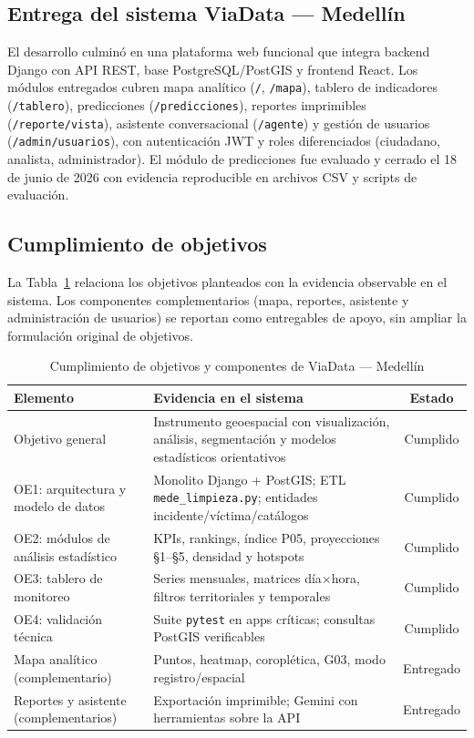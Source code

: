 \subsection{Entrega del sistema ViaData — Medellín}

El desarrollo culminó en una plataforma web funcional que integra backend Django con API REST, base PostgreSQL/PostGIS y frontend React. Los módulos entregados cubren mapa analítico (\texttt{/}, \texttt{/mapa}), tablero de indicadores (\texttt{/tablero}), predicciones (\texttt{/predicciones}), reportes imprimibles (\texttt{/reporte/vista}), asistente conversacional (\texttt{/agente}) y gestión de usuarios (\texttt{/admin/usuarios}), con autenticación JWT y roles diferenciados (ciudadano, analista, administrador). El módulo de predicciones fue evaluado y cerrado el 18 de junio de 2026 con evidencia reproducible en archivos CSV y scripts de evaluación.

\subsection{Cumplimiento de objetivos}

La Tabla~\ref{tab:cumplimiento-objetivos} relaciona los objetivos planteados con la evidencia observable en el sistema. Los componentes complementarios (mapa, reportes, asistente y administración de usuarios) se reportan como entregables de apoyo, sin ampliar la formulación original de objetivos.

\begin{table}[H]
	\centering
	\caption{Cumplimiento de objetivos y componentes de ViaData — Medellín}
	\label{tab:cumplimiento-objetivos}
	\small
	\begin{tabularx}{\linewidth}{@{}l X c@{}}
		\toprule
		\textbf{Elemento} & \textbf{Evidencia en el sistema} & \textbf{Estado} \\
		\midrule
		Objetivo general & Instrumento geoespacial con visualización, análisis, segmentación y modelos estadísticos orientativos & Cumplido \\
		OE1: arquitectura y modelo de datos & Monolito Django + PostGIS; ETL \texttt{mede\_limpieza.py}; entidades incidente/víctima/catálogos & Cumplido \\
		OE2: módulos de análisis estadístico & KPIs, rankings, índice P05, proyecciones §1--§5, densidad y hotspots & Cumplido \\
		OE3: tablero de monitoreo & Series mensuales, matrices día$\times$hora, filtros territoriales y temporales & Cumplido \\
		OE4: validación técnica & Suite \texttt{pytest} en apps críticas; consultas PostGIS verificables & Cumplido \\
		Mapa analítico (complementario) & Puntos, heatmap, coroplética, G03, modo registro/espacial & Entregado \\
		Reportes y asistente (complementarios) & Exportación imprimible; Gemini con herramientas sobre la API & Entregado \\
		\bottomrule
	\end{tabularx}
\end{table}

